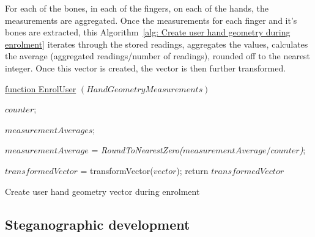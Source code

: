For each of the bones, in each of the fingers, on each of the hands, the measurements are aggregated. Once the measurements for each finger and it's bones are extracted, this Algorithm~\ref{alg: Create user hand geometry during enrolment} iterates through the stored readings, aggregates the values, calculates the average (aggregated readings/number of readings), rounded off to the nearest integer. Once this vector is created, the vector is then further transformed. 


\begin{algorithm}
    \underline{function EnrolUser} $(HandGeometryMeasurements)$\;
    
    $counter$; 
    
    $measurementAverages$; 
    
    $measurementAverage$ = \textit{RoundToNearestZero($measurementAverage/counter$)};
    
    
    
        $transformedVector$ = transformVector($vector$);
    return $transformedVector$
    \caption{Create user hand geometry vector during enrolment}
    \label{alg: Create user hand geometry during enrolment}
    
\end{algorithm}


\subsection{Steganographic development}



